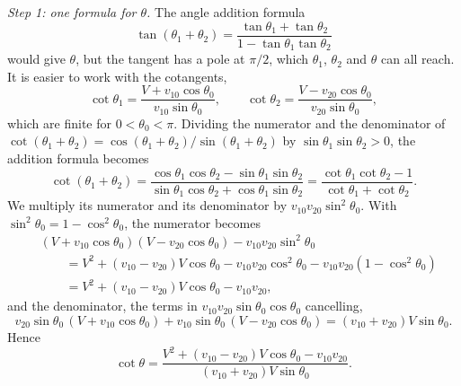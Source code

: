 \begin{problem}[title={Range of angles between two decay products}]
{\textit{Step 1: one formula for $\theta$.} The angle addition formula
\begin{equation*}
    \tan{(\theta_1+\theta_2)} = \frac{\tan{\theta_1}+\tan{\theta_2}}{1-\tan{\theta_1}\tan{\theta_2}}
\end{equation*}
would give $\theta$, but the tangent has a pole at $\pi/2$, which $\theta_1$, $\theta_2$ and $\theta$ can all reach. It is easier to work with the cotangents,
\begin{equation*}
    \cot{\theta_1} = \frac{V+v_{10}\cos{\theta_0}}{v_{10}\sin{\theta_0}}, \qquad
    \cot{\theta_2} = \frac{V-v_{20}\cos{\theta_0}}{v_{20}\sin{\theta_0}},
\end{equation*}
which are finite for $0<\theta_0<\pi$. Dividing the numerator and the denominator of $\cot{(\theta_1+\theta_2)} = \cos{(\theta_1+\theta_2)}/\sin{(\theta_1+\theta_2)}$ by $\sin{\theta_1}\sin{\theta_2}>0$, the addition formula becomes
\begin{equation*}
    \cot{(\theta_1+\theta_2)} = \frac{\cos{\theta_1}\cos{\theta_2}-\sin{\theta_1}\sin{\theta_2}}{\sin{\theta_1}\cos{\theta_2}+\cos{\theta_1}\sin{\theta_2}} = \frac{\cot{\theta_1}\cot{\theta_2}-1}{\cot{\theta_1}+\cot{\theta_2}}.
\end{equation*}
We multiply its numerator and its denominator by $v_{10}v_{20}\sin^2{\theta_0}$. With $\sin^2{\theta_0} = 1-\cos^2{\theta_0}$, the numerator becomes
\begin{align*}
    &(V+v_{10}\cos{\theta_0})(V-v_{20}\cos{\theta_0}) - v_{10}v_{20}\sin^2{\theta_0} \\
    &\qquad = V^2 + (v_{10}-v_{20})V\cos{\theta_0} - v_{10}v_{20}\cos^2{\theta_0} - v_{10}v_{20}(1-\cos^2{\theta_0}) \\
    &\qquad = V^2 + (v_{10}-v_{20})V\cos{\theta_0} - v_{10}v_{20},
\end{align*}
and the denominator, the terms in $v_{10}v_{20}\sin{\theta_0}\cos{\theta_0}$ cancelling,
\begin{equation*}
    v_{20}\sin{\theta_0}\,(V+v_{10}\cos{\theta_0}) + v_{10}\sin{\theta_0}\,(V-v_{20}\cos{\theta_0}) = (v_{10}+v_{20})V\sin{\theta_0}.
\end{equation*}
Hence
\begin{equation}
    \cot{\theta} = \frac{V^2+(v_{10}-v_{20})V\cos{\theta_0} - v_{10}v_{20}}{(v_{10}+v_{20})V\sin{\theta_0}}. \label{S16P3_cot}
\end{equation}
}
\end{problem}
